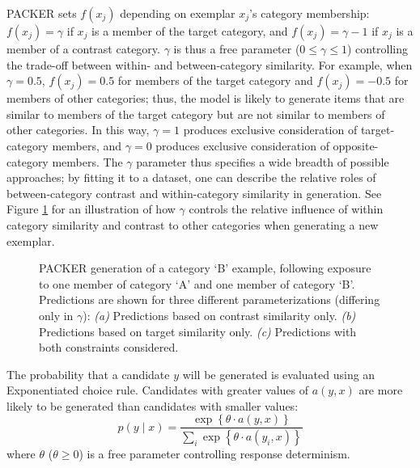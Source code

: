 \documentclass[12pt]{article}
\newcommand\inputpgf[2]{{
\let\pgfimageWithoutPath\pgfimage
\renewcommand{\pgfimage}[2][]{\pgfimageWithoutPath[##1]{#1/##2}}

}}
\begin{document}
\begin{flushleft}
PACKER sets $f(x_j)$ depending on exemplar $x_j$'s category membership: $f(x_j) = \gamma$ if $x_j$ is a member of the target category, and $f(x_j) = \gamma - 1$ if $x_j$ is a member of a contrast category. $\gamma$ is thus a free parameter ($0 \leq \gamma \leq 1$) controlling the trade-off between within- and between-category similarity. For example, when $\gamma = 0.5$, $f(x_j) = 0.5$ for members of the target category and $f(x_j) = -0.5$ for members of other categories; thus, the model is likely to generate items that are similar to members of the target category but are not similar to members of other categories. In this way, $\gamma = 1$ produces exclusive consideration of target-category members, and $\gamma = 0$ produces exclusive consideration of opposite-category members. The $\gamma$ parameter thus specifies a wide breadth of possible approaches; by fitting it to a dataset, one can describe the relative roles of between-category contrast and within-category similarity in generation. See Figure \ref{fig:packer-examples} for an illustration of how $\gamma$ controls the relative influence of within category similarity and contrast to other categories when generating a new exemplar.

\begin{figure}
	\begin{center}
		\inputpgf{figs/}{packer-examples.pgf}
		\caption{PACKER generation of a category `B' example, following exposure to one member of category `A' and one member of category `B'. Predictions are shown for three different parameterizations (differing only in $\gamma$): {\em (a)} Predictions based on contrast similarity only. {\em (b)} Predictions based on target similarity only.  {\em (c)} Predictions with both constraints considered.}
		\label{fig:packer-examples}
	\end{center}
\end{figure}

The probability that a candidate $y$ will be generated is evaluated using an Exponentiated \citet{luce1977choice} choice rule. Candidates with greater values of $a(y,x)$ are more likely to be generated than candidates with smaller values:
% 
\begin{equation}
p(y \mid x) = \dfrac
{ \exp  \left \{ \theta \cdot a \left( y, x \right) \right \} } 
{ \sum_i{ \exp  \left \{ \theta \cdot a \left( y_i, x \right) \right\}  } }
\label{eq:packer-choice}
\end{equation}
% 
where $\theta$ ($\theta \geq 0$) is a free parameter controlling response determinism. 


\end{flushleft}
\end{document}
